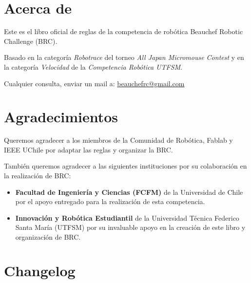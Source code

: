
\section*{Acerca de}
Este es el libro oficial de reglas de la competencia de robótica Beauchef Robotic Challenge (BRC).

Basado en la categoría \emph{Robotrace} del torneo \emph{All Japan Micromouse Contest} y en la categoría \emph{Velocidad} de la \emph{Competencia Robótica UTFSM}.

Cualquier consulta, enviar un mail a: \href{mailto:beauchefrc@gmail.com}{beauchefrc@gmail.com}

\section*{Agradecimientos}

Queremos agradecer a los miembros de la Comunidad de Robótica, Fablab y IEEE UChile por adaptar las reglas y organizar la BRC.

También queremos agradecer a las siguientes instituciones por su colaboración en la realización de BRC:

\begin{itemize}
   \item \textbf{Facultad de Ingeniería y Ciencias (FCFM)} de la Universidad de Chile por el apoyo entregado para la realización de esta competencia. 
   \item  \textbf{Innovación y Robótica Estudiantil} de la Universidad Técnica Federico Santa María (UTFSM) por su invaluable apoyo en la creación de este libro y organización de BRC.
 \end{itemize} 


\section*{Changelog}

